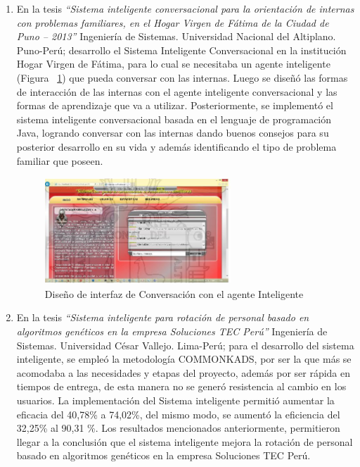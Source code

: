 \documentclass[10pt,conference]{IEEEtran}
\begin{document}
\begin{enumerate}
\item En la tesis \textit{“Sistema inteligente conversacional para la orientación de internas con problemas familiares, en el Hogar Virgen de F\'atima de la Ciudad de Puno – 2013”} Ingeniería de Sistemas. Universidad Nacional del Altiplano. Puno-Perú; \citep{godoy} desarrollo el Sistema Inteligente Conversacional en la institución Hogar Virgen de F\'atima, para lo cual se necesitaba un agente inteligente (Figura ~\ref{f5}) que pueda conversar con las internas. Luego se diseñó las formas de interacción de las internas con el agente inteligente conversacional y las formas de aprendizaje que va a utilizar. Posteriormente, se implementó el sistema inteligente conversacional basada en el lenguaje de programación Java, logrando conversar con las internas dando buenos consejos para su posterior desarrollo en su vida y además identificando el tipo de problema familiar que poseen.
\begin{figure}[H]
 \begin{center}
       \includegraphics[width=7cm, height=4cm]{figuras/5.JPG}
      \caption{ Diseño de interfaz de Conversación con el agente Inteligente}
      \label{f5} 
      \end{center}
\end{figure}
\item En la tesis \textit{“Sistema inteligente para rotación de personal basado en algoritmos genéticos en la empresa Soluciones TEC Perú”} Ingeniería de Sistemas. Universidad César Vallejo. Lima-Perú; \citep{rivera} para el desarrollo del sistema inteligente, se empleó la metodología COMMONKADS, por ser la que más se acomodaba a las necesidades y etapas del proyecto, además por ser rápida en tiempos de entrega, de esta manera no se generó resistencia al cambio en los usuarios. La implementación del Sistema inteligente permitió aumentar la eficacia del 40,78\% a 74,02\%, del mismo modo, se aumentó la eficiencia del 32,25\% al 90,31 \%. Los resultados mencionados anteriormente, permitieron llegar a la conclusión que el sistema inteligente mejora la rotación de personal basado en algoritmos genéticos en la empresa Soluciones TEC Perú.

\end{enumerate}
\end{document}
